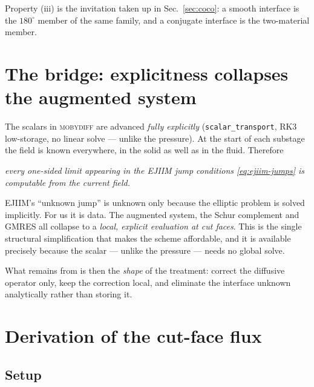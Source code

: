 \documentclass[11pt,a4paper]{article}
\newcommand{\code}[1]{\texttt{#1}}
\begin{document}
Property (iii) is the invitation taken up in Sec.~\ref{sec:coco}: a smooth
interface is the $180^\circ$ member of the same family, and a conjugate
interface is the two-material member.

\section{The bridge: explicitness collapses the augmented system}

The scalars in \textsc{mobydiff} are advanced \emph{fully explicitly}
(\code{scalar\_transport}, RK3 low-storage, no linear solve --- unlike the
pressure). At the start of each substage the field is known everywhere, in the
solid as well as in the fluid. Therefore
\begin{center}
\emph{every one-sided limit appearing in the EJIIM jump conditions
      \eqref{eq:ejiim-jumps} is computable from the current field.}
\end{center}
EJIIM's ``unknown jump'' is unknown only because the elliptic problem is solved
implicitly. For us it is data. The augmented system, the Schur complement and
GMRES all collapse to a \emph{local, explicit evaluation at cut faces}. This is
the single structural simplification that makes the scheme affordable, and it is
available precisely because the scalar --- unlike the pressure --- needs no
global solve.

What remains from \cite{luchini2025} is then the \emph{shape} of the treatment:
correct the diffusive operator only, keep the correction local, and eliminate
the interface unknown analytically rather than storing it.

\section{Derivation of the cut-face flux}
\label{sec:derivation}

\subsection{Setup}
\end{document}
